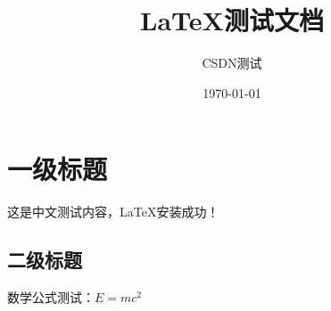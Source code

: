 \documentclass{article}
\title{LaTeX测试文档}
\author{CSDN测试}
\date{\today}
\begin{document}
\maketitle
 
\section{一级标题}
这是中文测试内容，LaTeX安装成功！
 
\subsection{二级标题}
数学公式测试：$E=mc^2$
 
\end{document}
